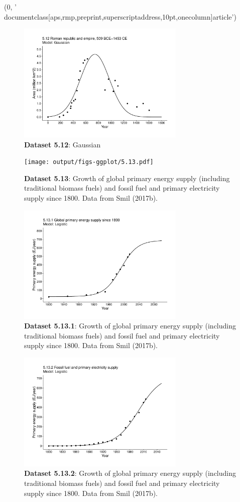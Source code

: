 (0, '\\documentclass[aps,rmp,preprint,superscriptaddress,10pt,onecolumn]{article}\n')
\begin{document}
\begin{figure}[h]
\includegraphics[width=8cm]{output/figs-ggplot/5.12.pdf}
\caption{\textbf{Dataset 5.12}: Gaussian}
\end{figure}
	
\begin{figure}[h]
\texttt{[image: output/figs-ggplot/5.13.pdf]}
\caption{\textbf{Dataset 5.13}: Growth of global primary energy supply (including traditional biomass fuels) and fossil fuel and primary electricity supply since 1800. Data from Smil (2017b). }
\end{figure}
	
\begin{figure}[h]
\includegraphics[width=8cm]{output/figs-ggplot/5.13.1.pdf}
\caption{\textbf{Dataset 5.13.1}: Growth of global primary energy supply (including traditional biomass fuels) and fossil fuel and primary electricity supply since 1800. Data from Smil (2017b). }
\end{figure}
	
\begin{figure}[h]
\includegraphics[width=8cm]{output/figs-ggplot/5.13.2.pdf}
\caption{\textbf{Dataset 5.13.2}: Growth of global primary energy supply (including traditional biomass fuels) and fossil fuel and primary electricity supply since 1800. Data from Smil (2017b). }
\end{figure}
	
\end{document}
